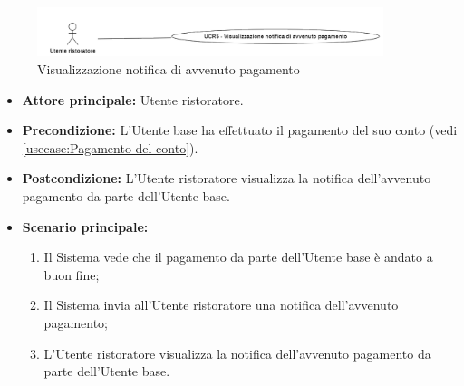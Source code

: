 \label{usecase:Visualizzazione notifica di avvenuto pagamento}

\begin{figure}[h]
	\centering
	\includegraphics[width=0.9\textwidth]{./uml/UCR5.png} 
	\caption{Visualizzazione notifica di avvenuto pagamento}
	\label{fig:UCR5}
  \end{figure}

\begin{itemize}
	\item \textbf{Attore principale:} Utente ristoratore.

	\item \textbf{Precondizione:} L'Utente base ha effettuato il pagamento del suo conto (vedi \autoref{usecase:Pagamento del conto}).


	\item \textbf{Postcondizione:} L'Utente ristoratore visualizza la notifica
		dell'avvenuto pagamento da parte dell'Utente base.

	\item \textbf{Scenario principale:}
	      \begin{enumerate}
		      \item Il Sistema vede che il pagamento da parte dell'Utente base è andato a buon fine;
		      \item Il Sistema invia all'Utente ristoratore una notifica dell'avvenuto pagamento;
		      \item L'Utente ristoratore visualizza la notifica dell'avvenuto
		            pagamento da parte dell'Utente base.
	      \end{enumerate}
\end{itemize}
